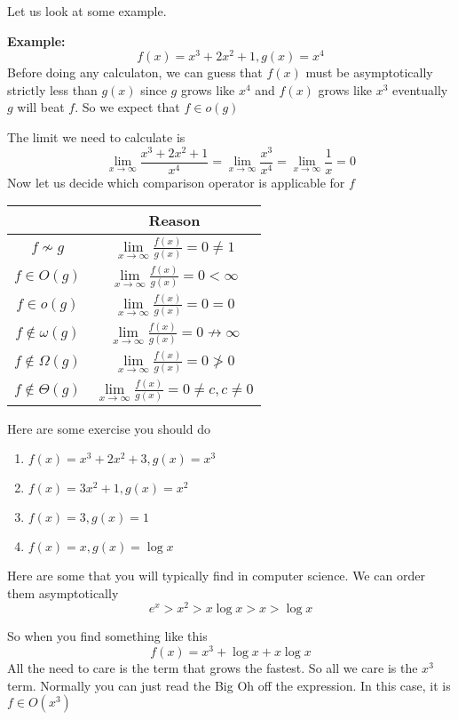 \documentclass[a4paper, 12pt]{article}
\newcommand{\example}{\vspace{1em}\noindent\textbf{Example:} }
\begin{document}
\begin{multicols}{2}
	Let us look at some example.
	
\example
	\[
		f(x) = x^3 + 2x^2 + 1, g(x) = x^4
	\]
Before doing any calculaton, we can guess that $f(x)$ must be asymptotically strictly less than $g(x)$ since $g$ grows like $x^4$ and $f(x)$ grows like $x^3$ eventually $g$ will beat $f$. So we expect that $f \in o(g)$

The limit we need to calculate is
\[
	\lim\limits_{x\to \infty} \frac{x^3 + 2x^2 +1}{x^4} = 	\lim\limits_{x\to \infty} \frac{x^3}{x^4} = 	\lim\limits_{x\to \infty} \frac{1}{x} = 0
\]
	Now let us decide which comparison operator is applicable for $f$
\begin{center}

\begin{tabular}{c|c}
	\hline
	\hline
	& Reason\\
	\hline\hline
	$f \not\sim g$  & $\lim\limits_{x\to \infty}\frac{f(x)}{g(x)} = 0  \ne 1$ \\ 
	$f \in O(g)$  & $\lim\limits_{x\to \infty}\frac{f(x)}{g(x)} = 0  < \infty$  \\ 
	$f \in o(g)$  & $\lim\limits_{x\to \infty}\frac{f(x)}{g(x)} = 0  = 0$  \\ 
	$f \notin \omega(g)$  & $\lim\limits_{x\to \infty}\frac{f(x)}{g(x)} = 0  \not\to \infty$  \\ 
	$f \notin \Omega(g)$  & $\lim\limits_{x\to \infty}\frac{f(x)}{g(x)} = 0  \not> 0$  \\ 
	$f \notin \Theta(g)$  & $\lim\limits_{x\to \infty}\frac{f(x)}{g(x)} = 0  \ne c, c\ne 0$  \\ 
	\hline \hline
\end{tabular} 
\end{center}

Here are some exercise you should do
\begin{enumerate}
\item $f(x) = x^3+2x^2+3, g(x) = x^3$
\item $f(x) = 3x^2 + 1, g(x) = x^2$
\item $f(x) = 3, g(x)=1$
\item $f(x) = x, g(x) = \log x$
\end{enumerate}

Here are some that you will typically find in computer science. We can order them asymptotically
\[
	e^x > x^2 > x \log x > x > \log x
\]

So when you find something like this
\[
	f(x) = x^3 + \log x + x \log x
\]
All the need to care is the term that grows the fastest. So all we care is the $x^3$ term. Normally you can just read the Big Oh off the expression. In this case, it is $f \in O(x^3)$



\end{multicols}
\end{document}
